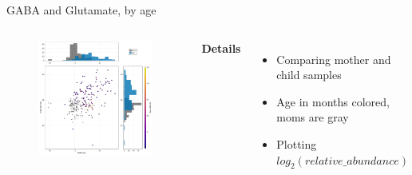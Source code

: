 
\begin{frame}{GABA and Glutamate, by age}
    \begin{columns}[c] %

    
        \begin{figure}
        \includegraphics[width=1\linewidth]{../figures/gaba-glutamate_age.png}
        \end{figure}

    
        \textbf{Details}
        \begin{itemize}
            \item Comparing mother and child samples
            \item Age in months colored, moms are gray
            \item Plotting $log_2(relative\_abundance)$
        \end{itemize}

    \end{columns}

\end{frame}


